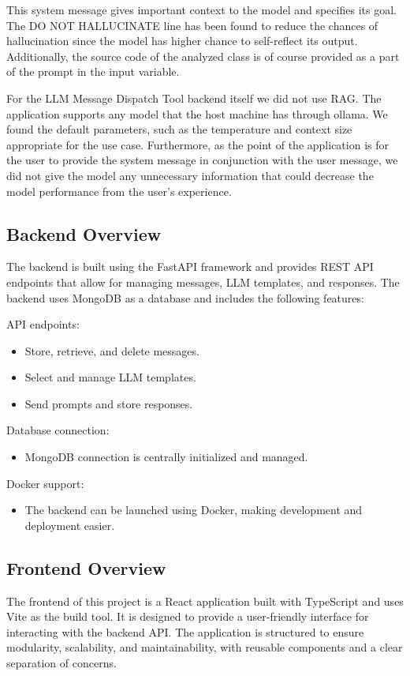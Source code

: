 \documentclass[sigconf]{acmart}
\begin{document}
This system message gives important context to the model and specifies its goal. The DO NOT HALLUCINATE line has been found to reduce the chances of hallucination since the model has higher chance to self-reflect its output. Additionally, the source code of the analyzed class is of course provided as a part of the prompt in the input variable.

For the LLM Message Dispatch Tool backend itself we did not use RAG. The application supports any model that the host machine has through ollama. We found the default parameters, such as the temperature and context size appropriate for the use case. Furthermore, as the point of the application is for the user to provide the system message in conjunction with the user message, we did not give the model any unnecessary information that could decrease the model performance from the user's experience.

\subsection{Backend Overview}
The backend is built using the FastAPI framework and provides REST API endpoints that allow for managing messages, LLM templates, and responses. The backend uses MongoDB as a database and includes the following features:

API endpoints:
\begin{itemize}
\item Store, retrieve, and delete messages.
\item Select and manage LLM templates.
\item Send prompts and store responses.
\end{itemize}

Database connection:
\begin{itemize}
\item MongoDB connection is centrally initialized and managed.
\end{itemize}

Docker support:
\begin{itemize}
\item The backend can be launched using Docker, making development and deployment easier.
\end{itemize}

\subsection{Frontend Overview}
The frontend of this project is a React application built with TypeScript and uses Vite as the build tool. It is designed to provide a user-friendly interface for interacting with the backend API. The application is structured to ensure modularity, scalability, and maintainability, with reusable components and a clear separation of concerns.
\end{document}
